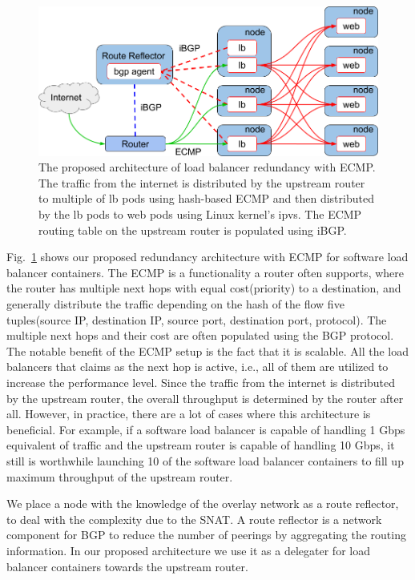 \begin{figure}[tb]
  \centering
  \includegraphics[width=0.8\columnwidth]{Figs/ecmp.png}
\caption{
  The proposed architecture of load balancer redundancy with ECMP. %
  The traffic from the internet is distributed by the upstream router to multiple of lb pods using hash-based ECMP and then distributed by the lb pods to web pods using Linux kernel's ipvs.
  The ECMP routing table on the upstream router is populated using iBGP.
}
\label{fig:ecmp}
\end{figure}

Fig.~\ref{fig:ecmp} shows our proposed redundancy architecture with ECMP for software load balancer containers.
%
The ECMP is a functionality a router often supports, where the router has multiple next hops with equal cost(priority) to a destination, and generally distribute the traffic depending on the hash of the flow five tuples(source IP, destination IP, source port, destination port, protocol).
The multiple next hops and their cost are often populated using the BGP protocol.
%
The notable benefit of the ECMP setup is the fact that it is scalable.
All the load balancers that claims as the next hop is active, i.e., all of them are utilized to increase the performance level.
Since the traffic from the internet is distributed by the upstream router, the overall throughput is determined by the router after all.
However, in practice, there are a lot of cases where this architecture is beneficial.
For example, if a software load balancer is capable of handling 1 Gbps equivalent of traffic and the upstream router is capable of handling 10 Gbps, it still is worthwhile launching 10 of the software load balancer containers to fill up maximum throughput of the upstream router.

%
We place a node with the knowledge of the overlay network as a route reflector, to deal with the complexity due to the SNAT.
A route reflector is a network component for BGP to reduce the number of peerings by aggregating the routing information\cite{rfc4456}.
In our proposed architecture we use it as a delegater for load balancer containers towards the upstream router.


